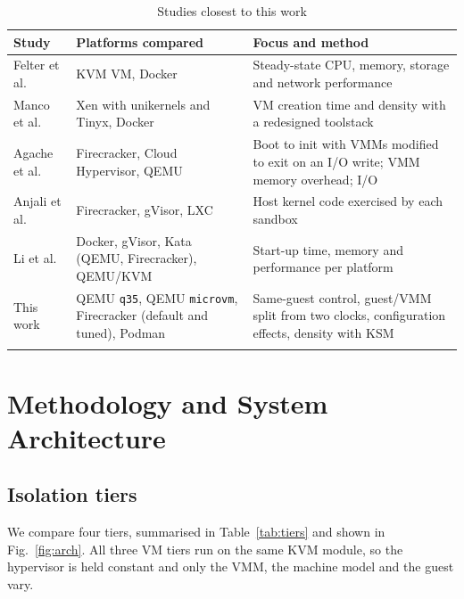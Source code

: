 \documentclass[pdflatex,sn-mathphys-num]{sn-jnl}%
\begin{document}
\begin{table}[ht]
\caption{Studies closest to this work}\label{tab:related}
\footnotesize
\begin{tabularx}{\textwidth}{@{}L{2.3cm}L{3.6cm}Y@{}}
\toprule
Study & Platforms compared & Focus and method \\
\midrule
Felter et al.~\cite{felter2015} & KVM VM, Docker & Steady-state CPU, memory, storage and network performance \\
Manco et al.~\cite{manco2017lightvm} & Xen with unikernels and Tinyx, Docker & VM creation time and density with a redesigned toolstack \\
Agache et al.~\cite{agache2020firecracker} & Firecracker, Cloud Hypervisor, QEMU & Boot to init with VMMs modified to exit on an I/O write; VMM memory overhead; I/O \\
Anjali et al.~\cite{anjali2020blending} & Firecracker, gVisor, LXC & Host kernel code exercised by each sandbox \\
Li et al.~\cite{li2021lightweight} & Docker, gVisor, Kata (QEMU, Firecracker), QEMU/KVM & Start-up time, memory and performance per platform \\
This work & QEMU \texttt{q35}, QEMU \texttt{microvm}, Firecracker (default and tuned), Podman & Same-guest control, guest/VMM split from two clocks, configuration effects, density with KSM \\
\botrule
\end{tabularx}
\end{table}

\section{Methodology and System Architecture}\label{sec:method}

\subsection{Isolation tiers}

We compare four tiers, summarised in Table~\ref{tab:tiers} and shown in Fig.~\ref{fig:arch}. All three VM tiers run on the same KVM module, so the hypervisor is held constant and only the VMM, the machine model and the guest vary.
\end{document}
